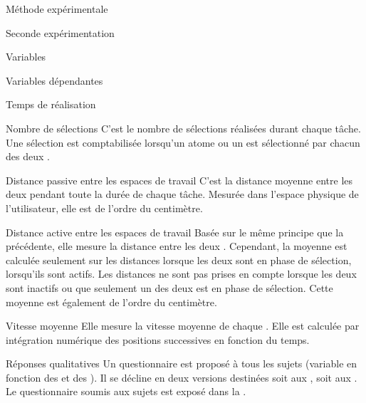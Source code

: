 \documentclass[myfrancais,ngerman,english,frenchb]{mythesis}
\begin{document}
\begin{mychapter}{Méthode expérimentale}
\begin{mysection}{Seconde expérimentation}
\begin{mysubsection}{Variables}
\begin{mysubsubsection}{Variables dépendantes}
\begin{myparagraph}{ Temps de réalisation}
					\end{myparagraph}
					\begin{myparagraph}{ Nombre de sélections}
						C'est le nombre de sélections réalisées durant chaque tâche.
						Une sélection est comptabilisée lorsqu'un atome ou un  est sélectionné par chacun des deux .
					\end{myparagraph}
					\begin{myparagraph}{ Distance passive entre les espaces de travail}
						C'est la distance moyenne entre les deux  pendant toute la durée de chaque tâche.
						Mesurée dans l'espace physique de l'utilisateur, elle est de l'ordre du centimètre.
					\end{myparagraph}
					\begin{myparagraph}{ Distance active entre les espaces de travail}
						Basée sur le même principe que la précédente, elle mesure la distance entre les deux .
						Cependant, la moyenne est calculée seulement sur les distances lorsque les deux  sont en phase de sélection, lorsqu'ils sont actifs.
						Les distances ne sont pas prises en compte lorsque les deux  sont inactifs ou que seulement un des deux est en phase de sélection.
						Cette moyenne est également de l'ordre du centimètre.
					\end{myparagraph}
					\begin{myparagraph}{ Vitesse moyenne}
						Elle mesure la vitesse moyenne de chaque .
						Elle est calculée par intégration numérique des positions successives en fonction du temps.
					\end{myparagraph}
					\begin{myparagraph}{ Réponses qualitatives}
						Un questionnaire est proposé à tous les sujets (variable en fonction des  et des ).
						Il se décline en deux versions destinées soit aux , soit aux .
						Le questionnaire soumis aux sujets est exposé dans la .
					\end{myparagraph}
				\end{mysubsubsection}

\end{mysubsection}
\end{mysection}
\end{mychapter}
\end{document}
